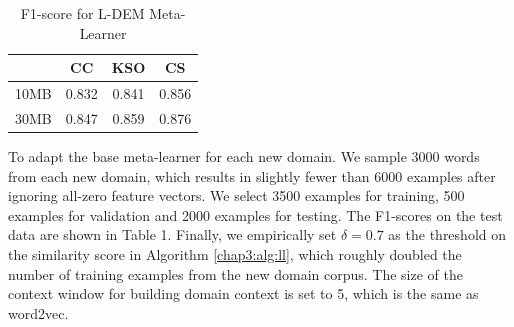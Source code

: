 \begin{table}
\begin{center}

\begin{tabular}{l || c | c | c }
\hline
 & CC & KSO & CS\\
\hline
\hline
10MB & 0.832 & 0.841 & 0.856 \\
30MB & 0.847 & 0.859 & 0.876 \\
\hline

\end{tabular}
\caption{F1-score for L-DEM Meta-Learner}
\end{center}
\label{chap3:table:fine-tune}
\end{table}

To adapt the base meta-learner for each new domain. We sample 3000 words from each new domain, which results in slightly fewer than 6000 examples after ignoring all-zero feature vectors.
We select 3500 examples for training, 500 examples for validation and 2000 examples for testing.
The F1-scores on the test data are shown in Table 1.
Finally, we empirically set $\delta=0.7$ as the threshold on the similarity score in Algorithm \ref{chap3:alg:ll}, which roughly doubled the number of training examples from the new domain corpus. 
The size of the context window for building domain context is set to 5, which is the same as word2vec.

